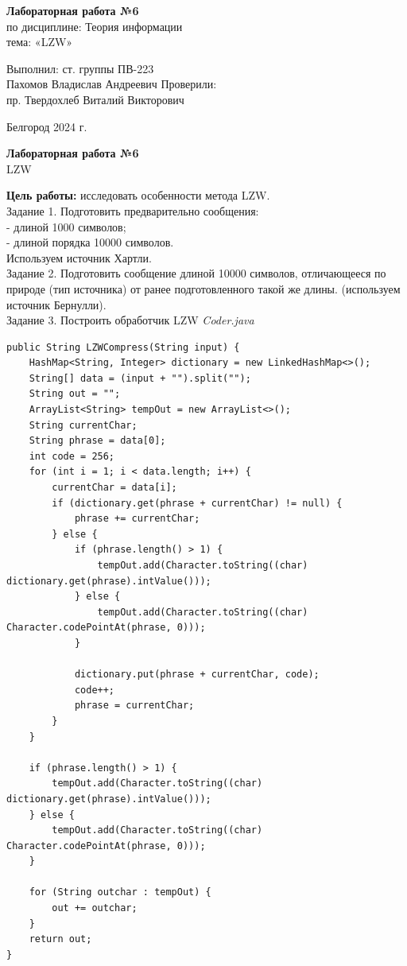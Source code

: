 \documentclass[a4paper,14pt]{extarticle}
\newcommand\textbox[1]{
	\parbox{.45\textwidth}{#1}
}
\begin{document}
\vfill
\begin{center}
    \large{
        \textbf{
            Лабораторная работа №6}}\\
    \normalsize{
        по дисциплине: Теория информации \\
        тема: «LZW»}
\end{center}
\vfill
\hfill\textbox{
    Выполнил: ст. группы ПВ-223\\Пахомов Владислав Андреевич
    \bigbreak
    Проверили: \\пр. Твердохлеб Виталий Викторович
}
\vfill\begin{center}
    Белгород 2024 г.
\end{center}
\newpage
\begin{center}
    \textbf{Лабораторная работа №6}\\
    LZW\\
\end{center}
\textbf{Цель работы: }исследовать особенности метода LZW.\\
Задание 1. Подготовить предварительно сообщения:\\
- длиной 1000 символов;\\
- длиной порядка 10000 символов.\\
Используем источник Хартли.\\
Задание 2.
Подготовить сообщение длиной 10000 символов, отличающееся по природе (тип источника) от ранее подготовленного такой же длины. (используем источник Бернулли).\\
Задание 3. Построить обработчик LZW
\textit{Coder.java}
\begin{verbatim}
public String LZWCompress(String input) {
    HashMap<String, Integer> dictionary = new LinkedHashMap<>();
    String[] data = (input + "").split("");
    String out = "";
    ArrayList<String> tempOut = new ArrayList<>();
    String currentChar;
    String phrase = data[0];
    int code = 256;
    for (int i = 1; i < data.length; i++) {
        currentChar = data[i];
        if (dictionary.get(phrase + currentChar) != null) {
            phrase += currentChar;
        } else {
            if (phrase.length() > 1) {
                tempOut.add(Character.toString((char) dictionary.get(phrase).intValue()));
            } else {
                tempOut.add(Character.toString((char) Character.codePointAt(phrase, 0)));
            }

            dictionary.put(phrase + currentChar, code);
            code++;
            phrase = currentChar;
        }
    }

    if (phrase.length() > 1) {
        tempOut.add(Character.toString((char) dictionary.get(phrase).intValue()));
    } else {
        tempOut.add(Character.toString((char) Character.codePointAt(phrase, 0)));
    }

    for (String outchar : tempOut) {
        out += outchar;
    }
    return out;
}
\end{verbatim}
\end{document}
